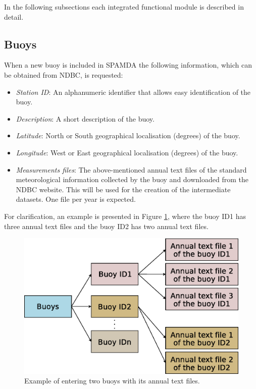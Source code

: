 \documentclass[energies,article,submit,moreauthors,pdftex]{Definitions/mdpi}
\begin{document}
		In the following subsections each integrated functional module is described in detail.

			\subsection{Buoys}\label{sec:Buoys}
			
				When a new buoy is included in SPAMDA the following information, which can be obtained from NDBC, is requested:
				\begin{itemize}[leftmargin=*,labelsep=5.8mm]
					\item \textit{Station ID}: An alphanumeric identifier that allows easy identification of the buoy.
					\item \textit{Description}: A short description of the buoy.
					\item \textit{Latitude}: North or South geographical localisation (degrees) of the buoy.
					\item \textit{Longitude}: West or East geographical localisation (degrees) of the buoy.
					\item \textit{Measurements files}: The above-mentioned annual text files of the standard meteorological information collected by the buoy and downloaded from the NDBC website. This will be used for the creation of the intermediate datasets. One file per year is expected.
				\end{itemize}
				
				For clarification, an example is presented in Figure \ref{fig:buoys}, where the buoy ID1 has three annual text files and the buoy ID2 has two annual text files.
				
				\begin{figure}[H]
					\centering
					\includegraphics[scale=0.42]{figures/FigureBuoys.eps}
					\caption{Example of entering two buoys with its annual text files.}
					\label{fig:buoys}
				\end{figure}
\end{document}

